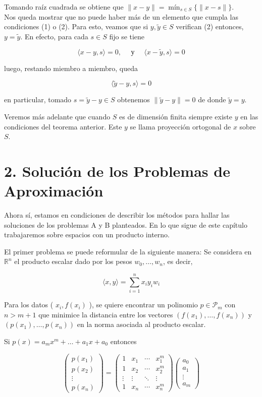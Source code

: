 \documentclass[10pt]{article}
\begin{document}
Tomando raíz cuadrada se obtiene que $\|x-y\|=\operatorname{mín}_{s \in S}\{\|x-s\|\}$.\\
Nos queda mostrar que no puede haber más de un elemento que cumpla las condiciones (1) o (2). Para esto, veamos que si $y, \widetilde{y} \in S$ verifican (2) entonces, $y=\widetilde{y}$. En efecto, para cada $s \in S$ fijo se tiene

$$
\langle x-y, s\rangle=0, \quad \text { у } \quad\langle x-\widetilde{y}, s\rangle=0
$$

luego, restando miembro a miembro, queda

$$
\langle\widetilde{y}-y, s\rangle=0
$$

en particular, tomado $s=\widetilde{y}-y \in S$ obtenemos $\|\widetilde{y}-y\|=0$ de donde $\widetilde{y}=y$.

Veremos más adelante que cuando $S$ es de dimensión finita siempre existe $y$ en las condiciones del teorema anterior. Este $y$ se llama proyección ortogonal de $x$ sobre $S$.

\section*{2. Solución de los Problemas de Aproximación}
Ahora sí, estamos en condiciones de describir los métodos para hallar las soluciones de los problemas A y B planteados. En lo que sigue de este capítulo trabajaremos sobre espacios con un producto interno.

El primer problema se puede reformular de la siguiente manera: Se considera en $\mathbb{R}^{n}$ el producto escalar dado por los pesos $w_{0}, \ldots, w_{n}$, es decir,

$$
\langle x, y\rangle=\sum_{i=1}^{n} x_{i} y_{i} w_{i}
$$

Para los datos ( $x_{i}, f\left(x_{i}\right)$ ), se quiere encontrar un polinomio $p \in \mathcal{P}_{m}$ con $n>m+1$ que minimice la distancia entre los vectores $\left(f\left(x_{1}\right), \ldots, f\left(x_{n}\right)\right)$ y $\left(p\left(x_{1}\right), \ldots, p\left(x_{n}\right)\right)$ en la norma asociada al producto escalar.

Si $p(x)=a_{m} x^{m}+\ldots+a_{1} x+a_{0}$ entonces

\[
\left(\begin{array}{c}
p\left(x_{1}\right)  \tag{6.2}\\
p\left(x_{2}\right) \\
\vdots \\
p\left(x_{n}\right)
\end{array}\right)=\left(\begin{array}{cccc}
1 & x_{1} & \cdots & x_{1}^{m} \\
1 & x_{2} & \cdots & x_{2}^{m} \\
\vdots & \vdots & \ddots & \vdots \\
1 & x_{n} & \cdots & x_{n}^{m}
\end{array}\right)\left(\begin{array}{c}
a_{0} \\
a_{1} \\
\vdots \\
a_{m}
\end{array}\right)
\]
\end{document}

